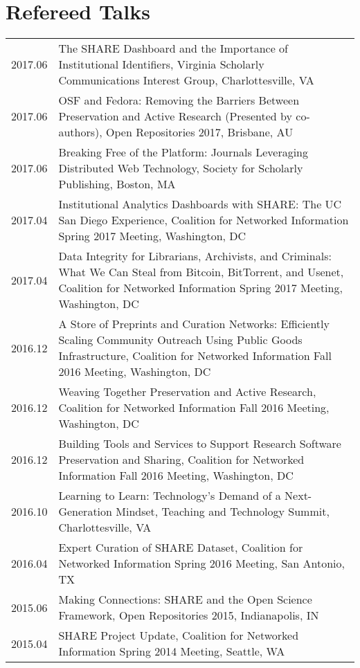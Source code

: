 \documentclass[11pt]{article}
\begin{document}
\section*{Refereed Talks}
\begin{tabularx}{\textwidth}{lX}
    2017.06    & The SHARE Dashboard and the Importance of Institutional Identifiers, Virginia Scholarly Communications Interest Group, Charlottesville, VA \\
    2017.06    & OSF and Fedora: Removing the Barriers Between Preservation and Active Research (Presented by co-authors), Open Repositories 2017, Brisbane, AU \\
    2017.06    & Breaking Free of the Platform: Journals Leveraging Distributed Web Technology, Society for Scholarly Publishing, Boston, MA\\
    2017.04    & Institutional Analytics Dashboards with SHARE: The UC San Diego Experience, Coalition for Networked Information Spring 2017 Meeting, Washington, DC\\
    2017.04    & Data Integrity for Librarians, Archivists, and Criminals: What We Can Steal from Bitcoin, BitTorrent, and Usenet, Coalition for Networked Information Spring 2017 Meeting, Washington, DC\\
    2016.12    & A Store of Preprints and Curation Networks: Efficiently Scaling Community Outreach Using Public Goods Infrastructure, Coalition for Networked Information Fall 2016 Meeting, Washington, DC\\
    2016.12    & Weaving Together Preservation and Active Research, Coalition for Networked Information Fall 2016 Meeting, Washington, DC\\
    2016.12    & Building Tools and Services to Support Research Software Preservation and Sharing,  Coalition for Networked Information Fall 2016 Meeting, Washington, DC\\
    2016.10    & Learning to Learn: Technology's Demand of a Next-Generation Mindset, Teaching and Technology Summit, Charlottesville, VA\\
    2016.04    & Expert Curation of SHARE Dataset, Coalition for Networked Information Spring 2016 Meeting, San Antonio, TX\\
    2015.06    & Making Connections: SHARE and the Open Science Framework, Open Repositories 2015, Indianapolis, IN\\
    2015.04    & SHARE Project Update, Coalition for Networked Information Spring 2014 Meeting, Seattle, WA\\

\end{tabularx}
\end{document}
